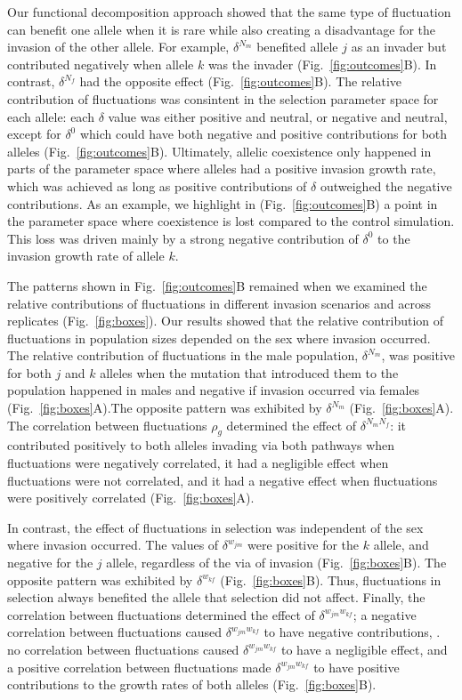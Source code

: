  Our functional decomposition approach showed that the same type of fluctuation can benefit one allele when it is rare while also creating a disadvantage for the invasion of the other allele. For example, $\delta^{N_{m}}$ benefited allele $j$ as an invader but contributed negatively when allele $k$ was the invader (Fig.~\ref{fig:outcomes}B). In contrast, $\delta^ {N_{f}}$ had the opposite effect (Fig.~\ref{fig:outcomes}B). The relative contribution of fluctuations was consintent in the selection parameter space for each allele: each $\delta$ value was either positive and neutral, or negative and neutral, except for $\delta^0$ which could have both negative and positive contributions for both alleles (Fig.~\ref{fig:outcomes}B). Ultimately, allelic coexistence only happened in parts of the parameter space where alleles had a positive invasion growth rate, which was achieved as long as positive contributions of $\delta$ outweighed the negative contributions. As an example, we highlight in (Fig.~\ref{fig:outcomes}B) a point in the parameter space where coexistence is lost compared to the control simulation. This loss was driven mainly by a strong negative contribution of $\delta^0$ to the invasion growth rate of allele $k$.

 The patterns shown in Fig.~\ref{fig:outcomes}B remained when we examined the relative contributions of fluctuations in different invasion scenarios and across replicates (Fig.~\ref{fig:boxes}). Our results showed that the relative contribution of fluctuations in population sizes depended on the sex where invasion occurred. The relative contribution of fluctuations in the male population, $\delta^{N_{m}}$,  was positive for both $j$ and $k$ alleles when the mutation that introduced them to the population happened in males and negative if invasion occurred via females (Fig.~\ref{fig:boxes}A).The opposite pattern was exhibited by  $\delta^{N_{m}}$ (Fig.~\ref{fig:boxes}A). The correlation between fluctuations $\rho_{g}$ determined the effect of  $\delta^{N_{m}N_{f}}$: it contributed positively to both alleles invading via both pathways when fluctuations were negatively correlated, it had a negligible effect when fluctuations were not correlated, and it had a negative effect when fluctuations were positively correlated (Fig.~\ref{fig:boxes}A).

 In contrast, the effect of fluctuations in selection was independent of the sex where invasion occurred. The values of $\delta^{w_{jm}}$ were positive for the $k$ allele,  and negative  for the $j$ allele, regardless of the via of invasion (Fig.~\ref{fig:boxes}B). The opposite pattern was exhibited by $\delta^{w_{kf}}$ (Fig.~\ref{fig:boxes}B). Thus, fluctuations in selection always benefited the allele that selection did not affect. Finally, the correlation between fluctuations determined the effect of $\delta^{w_{jm}w_{kf}}$;  a negative correlation between fluctuations caused $\delta^{w_{jm}w_{kf}}$ to have negative contributions, . no correlation between fluctuations caused $\delta^{w_{jm}w_{kf}}$ to have a negligible effect, and a positive correlation between fluctuations made $\delta^{w_{jm}w_{kf}}$ to have positive contributions to the growth rates of both alleles (Fig.~\ref{fig:boxes}B).



